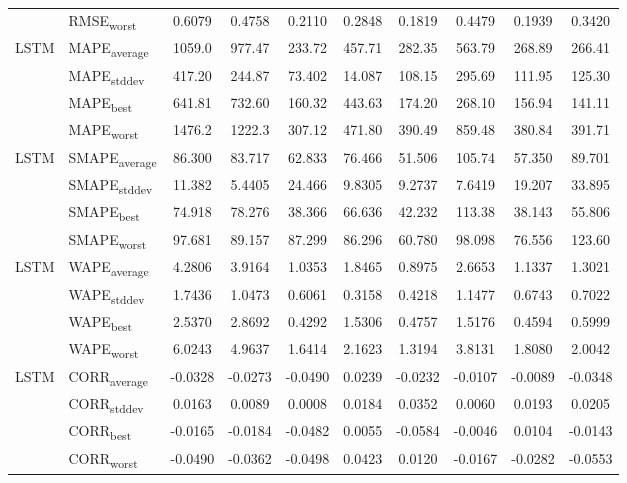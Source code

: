 {\begin{longtable}{l l c c c c c c c c}
 & RMSE\textsubscript{worst} & 0.6079 & 0.4758 & 0.2110 & 0.2848 & 0.1819 & 0.4479 & 0.1939 & 0.3420 \\
\cmidrule(lr){2-10}
\multirow{4}{*}{LSTM} & MAPE\textsubscript{average} & 1059.0 & 977.47 & 233.72 & 457.71 & 282.35 & 563.79 & 268.89 & 266.41 \\
 & MAPE\textsubscript{stddev} & 417.20 & 244.87 & 73.402 & 14.087 & 108.15 & 295.69 & 111.95 & 125.30 \\
 & MAPE\textsubscript{best} & 641.81 & 732.60 & 160.32 & 443.63 & 174.20 & 268.10 & 156.94 & 141.11 \\
 & MAPE\textsubscript{worst} & 1476.2 & 1222.3 & 307.12 & 471.80 & 390.49 & 859.48 & 380.84 & 391.71 \\
\cmidrule(lr){2-10}
\multirow{4}{*}{LSTM} & SMAPE\textsubscript{average} & 86.300 & 83.717 & 62.833 & 76.466 & 51.506 & 105.74 & 57.350 & 89.701 \\
 & SMAPE\textsubscript{stddev} & 11.382 & 5.4405 & 24.466 & 9.8305 & 9.2737 & 7.6419 & 19.207 & 33.895 \\
 & SMAPE\textsubscript{best} & 74.918 & 78.276 & 38.366 & 66.636 & 42.232 & 113.38 & 38.143 & 55.806 \\
 & SMAPE\textsubscript{worst} & 97.681 & 89.157 & 87.299 & 86.296 & 60.780 & 98.098 & 76.556 & 123.60 \\
\cmidrule(lr){2-10}
\multirow{4}{*}{LSTM} & WAPE\textsubscript{average} & 4.2806 & 3.9164 & 1.0353 & 1.8465 & 0.8975 & 2.6653 & 1.1337 & 1.3021 \\
 & WAPE\textsubscript{stddev} & 1.7436 & 1.0473 & 0.6061 & 0.3158 & 0.4218 & 1.1477 & 0.6743 & 0.7022 \\
 & WAPE\textsubscript{best} & 2.5370 & 2.8692 & 0.4292 & 1.5306 & 0.4757 & 1.5176 & 0.4594 & 0.5999 \\
 & WAPE\textsubscript{worst} & 6.0243 & 4.9637 & 1.6414 & 2.1623 & 1.3194 & 3.8131 & 1.8080 & 2.0042 \\
\cmidrule(lr){2-10}
\multirow{4}{*}{LSTM} & CORR\textsubscript{average} & -0.0328 & -0.0273 & -0.0490 & 0.0239 & -0.0232 & -0.0107 & -0.0089 & -0.0348 \\
 & CORR\textsubscript{stddev} & 0.0163 & 0.0089 & 0.0008 & 0.0184 & 0.0352 & 0.0060 & 0.0193 & 0.0205 \\
 & CORR\textsubscript{best} & -0.0165 & -0.0184 & -0.0482 & 0.0055 & -0.0584 & -0.0046 & 0.0104 & -0.0143 \\
 & CORR\textsubscript{worst} & -0.0490 & -0.0362 & -0.0498 & 0.0423 & 0.0120 & -0.0167 & -0.0282 & -0.0553 \\

\end{longtable}}
